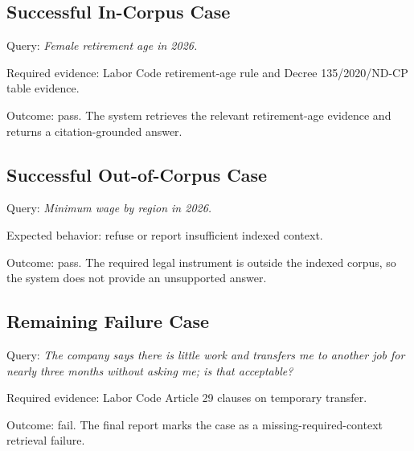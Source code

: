 \subsection{Successful In-Corpus Case}
Query: \textit{Female retirement age in 2026.}

Required evidence: Labor Code retirement-age rule and Decree 135/2020/ND-CP table evidence.

Outcome: pass. The system retrieves the relevant retirement-age evidence and returns a citation-grounded answer.

\subsection{Successful Out-of-Corpus Case}
Query: \textit{Minimum wage by region in 2026.}

Expected behavior: refuse or report insufficient indexed context.

Outcome: pass. The required legal instrument is outside the indexed corpus, so the system does not provide an unsupported answer.

\subsection{Remaining Failure Case}
Query: \textit{The company says there is little work and transfers me to another job for nearly three months without asking me; is that acceptable?}

Required evidence: Labor Code Article 29 clauses on temporary transfer.

Outcome: fail. The final report marks the case as a missing-required-context retrieval failure.

